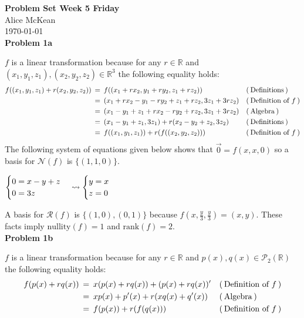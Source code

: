 \documentclass{article}
\newcommand{\problem}[1]{\large\textbf{Problem #1}\normalsize}
\newcommand{\evidence}[1]{\ensuremath{(\hspace{0.2em} \text{#1} \hspace{0.2em})}}
\newcommand{\relation}[1]{\ensuremath{\hspace{0.2em} {{} #1 {}} \hspace{0.2em}}}
\newcommand{\equal}{\relation{=}}
\begin{document}
\noindent\Large\textbf{Problem Set Week 5 Friday} \\
\normalsize
Alice McKean \\
\today \\

\problem{1a}

$f$ is a linear transformation because for any $r \in \mathbb{R}$ and
$(x_1, y_1, z_1), (x_2, y_2, z_2) \in \mathbb{R}^3$
the following equality holds:
\begin{align*}
  f((x_1, y_1, z_1) + r (x_2, y_2, z_2))
     & \equal f((x_1 + rx_2,y_1 + ry_2, z_1 + rz_2))                && \evidence{Definitions} \\
  {} & \equal (x_1 + rx_2 - y_1 - ry_2 + z_1 + rz_2, 3z_1 + 3rz_2)  && \evidence{Definition of $f$} \\
  {} & \equal (x_1 - y_1 +  z_1 + rx_2 - ry_2 + rz_2, 3z_1 + 3rz_2) && \evidence{Algebra} \\
  {} & \equal (x_1 - y_1 +  z_1, 3z_1) + r(x_2 - y_2 + z_2, 3z_2)   && \evidence{Definitions} \\
  {} & \equal f((x_1, y_1, z_1)) + r(f((x_2, y_2, z_2)))            && \evidence{Definition of $f$}
\end{align*}
The following system of equations given below shows that $\vec{0} = f(x, x, 0)$ so a
basis for $\mathcal{N}(f)$ is $\{ (1, 1, 0) \}$.

$
\begin{cases}
  0 = x - y + z \\
  0 = 3z
\end{cases}
\rightsquigarrow
\begin{cases}
  y = x \\
  z = 0
\end{cases} \vspace{0.2em}
$

A basis for $\mathcal{R}(f)$
is $\{ (1, 0), (0, 1) \}$ because $f(x, \frac{y}{3}, \frac{y}{3}) = (x, y)$.
These facts imply $\text{nullity}(f) = 1$ and $\text{rank}(f) = 2$. \\

\problem{1b}

$f$ is a linear transformation because for any $r \in \mathbb{R}$ and $p(x), q(x) \in
\mathcal{P}_2(\mathbb{R})$ the following equality holds:
\begin{align*}
  f(p(x) + rq(x)) & \equal  x(p(x) + rq(x)) + (p(x) + rq(x))' && \evidence{Definition of $f$} \\
  {} & \equal  xp(x) + p'(x) + r(xq(x) + q'(x))  && \evidence{Algebra} \\
  {} & \equal f(p(x)) + r(f(q(x))) && \evidence{Definition of $f$}
\end{align*}
\end{document}
